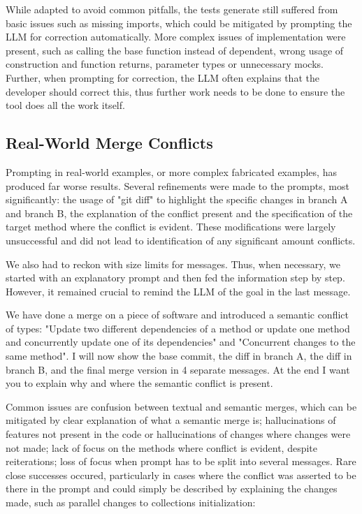 While adapted to avoid common pitfalls, the tests generate still suffered from basic issues such as missing imports, which could be mitigated by prompting the LLM for correction automatically. More complex issues of implementation were present, such as calling the base function instead of dependent, wrong usage of construction and function returns, parameter types or unnecessary mocks. Further, when prompting for correction, the LLM often explains that the developer should correct this, thus further work needs to be done to ensure the tool does all the work itself.

\subsection{Real-World Merge Conflicts}

Prompting in real-world examples, or more complex fabricated examples, has produced far worse results. Several refinements were made to the prompts, most significantly: the usage of "git diff" to highlight the specific changes in branch A and branch B, the explanation of the conflict present and the specification of the target method where the conflict is evident. These modifications were largely unsuccessful and did not lead to identification of any significant amount conflicts.

We also had to reckon with size limits for messages. Thus, when necessary, we started with an explanatory prompt and then fed the information step by step. However, it remained crucial to remind the LLM of the goal in the last message.

\begin{prompt}
We have done a merge on a piece of software and introduced a semantic conflict of types: "Update two different dependencies of a method or update one method and concurrently update one of its dependencies" and "Concurrent changes to the same method". I will now show the base commit, the diff in branch A, the diff in branch B, and the final merge version in 4 separate messages. At the end I want you to explain why and where the semantic conflict is present.
\end{prompt}

Common issues are confusion between textual and semantic merges, which can be mitigated by clear explanation of what a semantic merge is; hallucinations of features not present in the code or hallucinations of changes where changes were not made; lack of focus on the methods where conflict is evident, despite reiterations; loss of focus when prompt has to be split into several messages. 
Rare close successes occured, particularly in cases where the conflict was asserted to be there in the prompt and could simply be described by explaining the changes made, such as parallel changes to collections initialization:

